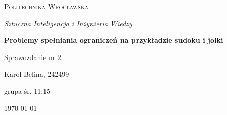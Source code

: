 \documentclass[12pt,a4paper]{article}
\begin{document}
\begin{titlepage}
  \centering
  \vspace*{2cm}
  {\scshape\large Politechnika Wrocławska \par}
  \vspace{1cm}
  {\itshape\large Sztuczna Inteligencja i Inżynieria Wiedzy\par}
  \vspace{1.5cm}
  {\LARGE\bfseries Problemy spełniania ograniczeń na przykładzie sudoku i jolki\par}
  \vspace{1cm}
  {\Large Sprawozdanie nr 2\par}
  \vfill
  {\large Karol Belina, 242499\par grupa śr. 11:15}
  \vfill
  {\large \today\par}
\end{titlepage}

\tableofcontents

\begin{thebibliography}{9}
\end{thebibliography}
 
\end{document}
